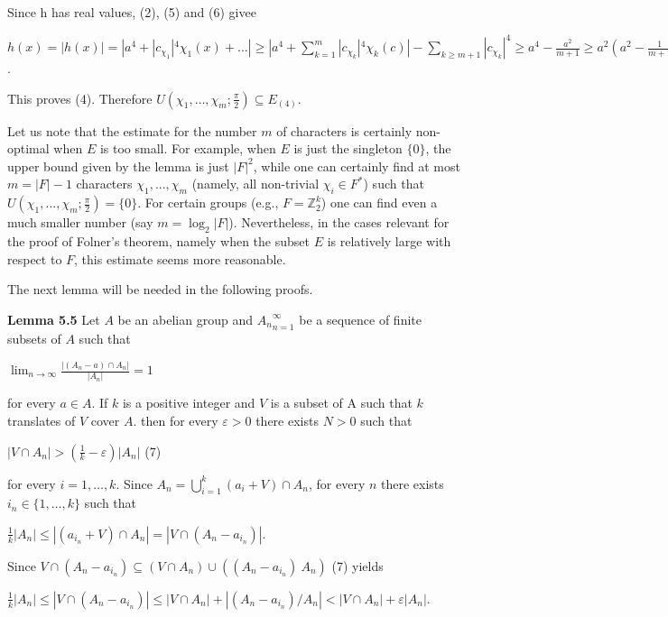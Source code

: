 \documentclass[12pt]{article}
\begin{document}
Since h has real values, (2), (5) and (6) givee


$h(x) = |h(x)| = |a^4 + |c_{\chi_1}|^4 \chi_1 (x) + \dots | \geq |a^4 + \sum^m_{k=1} |c_{\chi_k}|^4 \chi_k (c)| - \sum_{k \geq m + 1} |c_{\chi_k}|^4 \geq a^4 - \frac{a^2}{m+1} \geq a^2(a^2 - \frac{1}{m+1}) > 0$.


This proves (4). Therefore $U(\chi_1, \dots, \chi_m; \frac{\pi}{2}) \subseteq E_{(4)}$.



Let us note that the estimate for the number $m$ of characters is certainly non-optimal when $E$ is too small.
For example, when $E$ is just the singleton $\{0\}$, the upper bound given by the lemma is just $|F|^2$, while one
can certainly find at most $m = |F| - 1$ characters $\chi_1, . . . , \chi_m$ (namely, all non-trivial $\chi_i \in F^*$) such that
$U(\chi_1, . . . , \chi_m; \frac{\pi}{2}) = \{0\}$. For certain groups (e.g., $F = \mathbb{Z}^k_2$) one can find even a much smaller number (say
$m = \log_2|F|$). Nevertheless, in the cases relevant for the proof of Folner's theorem, namely when the subset $E$
is relatively large with respect to $F$, this estimate seems more reasonable.


    The next lemma will be needed in the following proofs.


\textbf{Lemma 5.5} Let $A$ be an abelian group and ${A_n}^{\infty}_{n=1}$ be a sequence of finite subsets of $A$ such that


    $\lim_{n \to \infty} \frac{|(A_n - a) \cap A_n|}{|A_n|} = 1$


for every $a \in A$. If $k$ is a positive integer and $V$ is a subset of A such that $k$ translates of $V$ cover $A$. then for
every $\varepsilon > 0$ there exists $N > 0$ such that


    $|V \cap A_n| > (\frac{1}{k} - \varepsilon) |A_n|$ (7)


for every $i = 1, \dots, k$. Since $A_n = \bigcup^k_{i=1} (a_i + V) \cap A_n$, for every $n$ there exists $i_n \in \{1, \dots, k\}$ such that


    $\frac{1}{k} |A_n| \leq |(a_{i_n} + V) \cap A_n| = |V \cap (A_n - a_{i_n})|$.


Since $V \cap (A_n - a_{i_n}) \subseteq (V \cap A_n) \cup ((A_n - a_{i_n}) \ A_n)$  (7) yields


    $\frac{1}{k}|A_n| \leq |V \cap (A_n - a_{i_n})| \leq |V \cap A_n| + |(A_n - a_{i_n}) / A_n| < |V \cap A_n| + \varepsilon |A_n|$.
\end{document}
